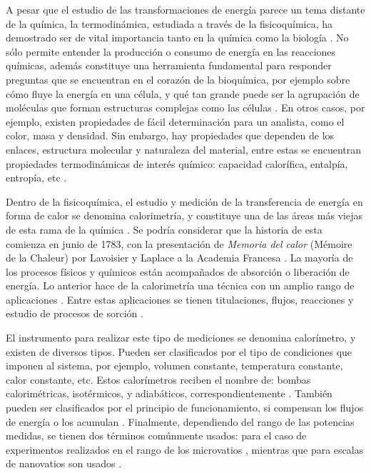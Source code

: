 	A pesar que el estudio de las transformaciones de energía parece un tema distante de la química, la termodinámica, estudiada a través de la fisicoquímica, ha demostrado ser de vital importancia tanto en la química como la biología \cite{atkins2011physical}. No sólo permite entender la producción o consumo de energía en las reacciones químicas, además constituye una herramienta fundamental para responder preguntas que se encuentran en el corazón de la bioquímica, por ejemplo sobre cómo fluye la energía en una célula, y qué tan grande puede ser la agrupación de moléculas que forman estructuras complejas como las células \cite{atkins2011physical}. En otros casos, por ejemplo, existen propiedades de fácil determinación para un analista, como el color, masa y densidad. Sin embargo, hay propiedades que dependen de los enlaces, estructura molecular y naturaleza del material, entre estas se encuentran propiedades termodinámicas de interés químico: capacidad calorífica, entalpía, entropía, etc \cite{gaisford2016principles}.
	
	Dentro de la fisicoquímica, el estudio y medición de la transferencia de energía en forma de calor se denomina calorimetría, y constituye una de las áreas más viejas de esta rama de la química \cite{zielenkiewicz2006theory}. Se podría considerar que la historia de esta comienza en junio de 1783, con la presentación de \textit{Memoria del calor} (Mémoire de la Chaleur) por Lavoisier y Laplace a la Academia Francesa \cite{zielenkiewicz2006theory}. La mayoría de los procesos físicos y químicos están acompañados de absorción o liberación de energía. Lo anterior hace de la calorimetría una técnica con un amplio rango de aplicaciones \cite{wadso2001standards}. Entre estas aplicaciones se tienen titulaciones, flujos, reacciones y estudio de procesos de sorción \cite{gaisford2016principles}.
		
	El instrumento para realizar este tipo de mediciones se denomina calorímetro, y existen de diversos tipos. Pueden ser clasificados por el tipo de condiciones que imponen al sistema, por ejemplo, volumen constante, temperatura constante, calor constante, etc. Estos calorímetros reciben el nombre de: bombas calorimétricas, isotérmicos, y adiabáticos, correspondientemente \cite{gaisford2016principles, wadso2001standards}. También pueden ser clasificados por el principio de funcionamiento, si compensan los flujos de energía o los acumulan \cite{gaisford2016principles}. Finalmente, dependiendo del rango de las potencias medidas, se tienen dos términos comúnmente usados:  para el caso de experimentos realizados en el rango de los microvatios \cite{wadso2001standards, wadso2003new}, mientras que para escalas de nanovatios son usados  \cite{wadso2003new}.
	
